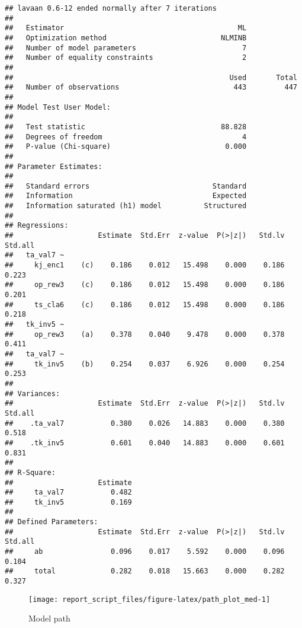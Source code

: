 \documentclass[
]{article}
\begin{document}
\begin{verbatim}
## lavaan 0.6-12 ended normally after 7 iterations
## 
##   Estimator                                         ML
##   Optimization method                           NLMINB
##   Number of model parameters                         7
##   Number of equality constraints                     2
## 
##                                                   Used       Total
##   Number of observations                           443         447
## 
## Model Test User Model:
##                                                       
##   Test statistic                                88.828
##   Degrees of freedom                                 4
##   P-value (Chi-square)                           0.000
## 
## Parameter Estimates:
## 
##   Standard errors                             Standard
##   Information                                 Expected
##   Information saturated (h1) model          Structured
## 
## Regressions:
##                    Estimate  Std.Err  z-value  P(>|z|)   Std.lv  Std.all
##   ta_val7 ~                                                             
##     kj_enc1    (c)    0.186    0.012   15.498    0.000    0.186    0.223
##     op_rew3    (c)    0.186    0.012   15.498    0.000    0.186    0.201
##     ts_cla6    (c)    0.186    0.012   15.498    0.000    0.186    0.218
##   tk_inv5 ~                                                             
##     op_rew3    (a)    0.378    0.040    9.478    0.000    0.378    0.411
##   ta_val7 ~                                                             
##     tk_inv5    (b)    0.254    0.037    6.926    0.000    0.254    0.253
## 
## Variances:
##                    Estimate  Std.Err  z-value  P(>|z|)   Std.lv  Std.all
##    .ta_val7           0.380    0.026   14.883    0.000    0.380    0.518
##    .tk_inv5           0.601    0.040   14.883    0.000    0.601    0.831
## 
## R-Square:
##                    Estimate
##     ta_val7           0.482
##     tk_inv5           0.169
## 
## Defined Parameters:
##                    Estimate  Std.Err  z-value  P(>|z|)   Std.lv  Std.all
##     ab                0.096    0.017    5.592    0.000    0.096    0.104
##     total             0.282    0.018   15.663    0.000    0.282    0.327
\end{verbatim}

\begin{figure}

{\centering \texttt{[image: report\_script\_files/figure-latex/path\_plot\_med-1]} 

}

\caption{Model path}\label{fig:path_plot_med}
\end{figure}
\end{document}
